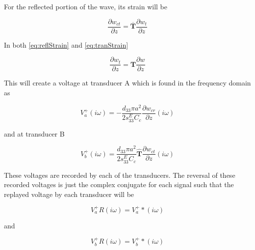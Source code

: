 For the reflected portion of the wave, its strain will be
  
\begin{equation}
\frac{\partial w_{ct}}{\partial z} = \overline{\boldsymbol{T}}\frac{\partial w_t}{\partial z}
\label{eq:tranStrain}
\end{equation}

In both \ref{eq:reflStrain} and \ref{eq:tranStrain}

\begin{equation}
\frac{\partial w_t}{\partial z} = \boldsymbol{T} \frac{\partial w}{\partial z}
\end{equation}



This will create a voltage at transducer A which is found in the frequency domain as

\begin{equation}
V^+_a(i\omega) = -\frac{d_{33} \pi a^2}{2 s^E_{33} C_c} \frac{\partial w_{cr}}{\partial z} (i\omega)
\end{equation}

and at transducer B

\begin{equation}
V^+_b(i\omega) = \frac{d_{33} \pi a^2}{2 s^E_{33} C_c} \boldsymbol{\hat{T}}\frac{\partial w_{ct}}{\partial z} (i\omega)
\end{equation}



These voltages are recorded by each of the transducers. The reversal of these recorded voltages is just the complex conjugate for each signal such that the replayed voltage by each transducer will be

\begin{equation}
V^+_a{R}(i\omega) = V^+_a*(i\omega)
\end{equation} 

and

\begin{equation}
V^+_b{R}(i\omega) = V^+_b*(i\omega)
\end{equation} 

